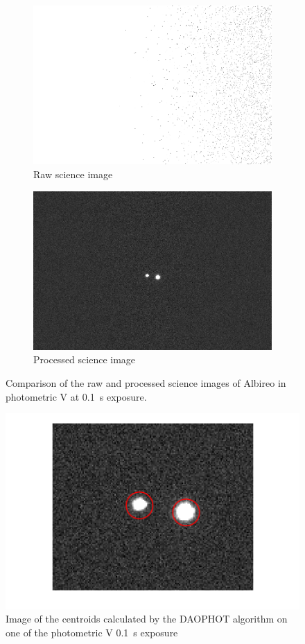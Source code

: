 \documentclass[%
aip,
jmp,
reprint,
floatfix,
nobibfootnote,
]{revtex4-1}
\begin{document}
	\begin{figure}[]
		\begin{subfigure}{\linewidth}
			\centering
			\includegraphics[width=.8\linewidth]{figs/pre.png}
			\caption{Raw science image}
		\end{subfigure}
		\begin{subfigure}{\linewidth}
			\centering
			\includegraphics[width=.8\linewidth]{figs/post.png}
			\caption{Processed science image}
		\end{subfigure}
		\caption{Comparison of the raw and processed science images of Albireo in photometric V at \SI{0.1}{\second} exposure.}
		\label{fig:comparison}
	\end{figure}

	\begin{figure}
		\centering
		\includegraphics[width=\linewidth]{figs/dao.png}
		\caption{Image of the centroids calculated by the DAOPHOT algorithm on one of the photometric V \SI{0.1}{\second} exposure}
		\label{fig:centroids}
	\end{figure}
\end{document}
